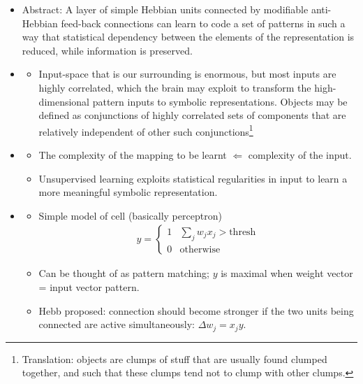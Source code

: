 \documentclass[12pt]{article}
\begin{document}
\begin{itemize}
	\item Abstract: A layer of simple Hebbian units connected by modifiable anti-Hebbian feed-back connections can learn to code a set of patterns in such a way that statistical dependency between the elements of the representation is reduced, while information is preserved.
	\item {}
	\begin{itemize}
		\item Input-space that is our surrounding is enormous, but most inputs are highly correlated, which the brain may exploit to transform the high-dimensional pattern inputs to symbolic representations. Objects may be defined as conjunctions of highly correlated sets of components that are relatively independent of other such conjunctions\footnote{Translation: objects are clumps of stuff that are usually found clumped together, and such that these clumps tend not to clump with other clumps.}
	\end{itemize}
	
	\item {}
	\begin{itemize}
		\item The complexity of the mapping to be learnt $\Leftarrow$ complexity of the input.  
		\item Unsupervised learning exploits statistical regularities in input to learn a more meaningful symbolic representation. 
	\end{itemize}
	\item {}
	\begin{itemize}
		\item Simple model of cell (basically perceptron)
		\begin{align}
			y = 
			\begin{cases}
				1 & \sum_j w_j x_j > \text{thresh} \\
				0 & \text{otherwise}
			\end{cases}
		\end{align}
		\item Can be thought of as pattern matching; $y$ is maximal when weight vector = input vector pattern. 
		\item Hebb proposed: connection should become stronger if the two units being connected are active simultaneously: $\Delta w_j = x_j y$. 
	\end{itemize}
	

\end{itemize}
\end{document}

